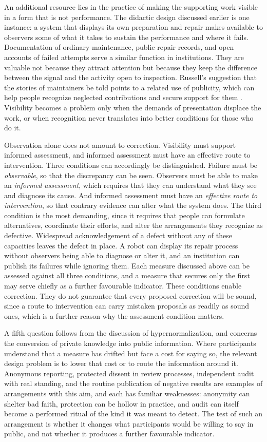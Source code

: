 \documentclass[11pt]{article}
\theoremstyle{definition}
\theoremstyle{remark}
\begin{document}
An additional resource lies in the practice of making the supporting work visible in a form that is not performance. The didactic design discussed earlier is one instance: a system that displays its own preparation and repair makes available to observers some of what it takes to sustain the performance and where it fails. Documentation of ordinary maintenance, public repair records, and open accounts of failed attempts serve a similar function in institutions. They are valuable not because they attract attention but because they keep the difference between the signal and the activity open to inspection. Russell's suggestion that the stories of maintainers be told points to a related use of publicity, which can help people recognize neglected contributions and secure support for them \cite{russell2017}. Visibility becomes a problem only when the demands of presentation displace the work, or when recognition never translates into better conditions for those who do it.

Observation alone does not amount to correction. Visibility must support informed assessment, and informed assessment must have an effective route to intervention. Three conditions can accordingly be distinguished. Failure must be \emph{observable}, so that the discrepancy can be seen. Observers must be able to make an \emph{informed assessment}, which requires that they can understand what they see and diagnose its cause. And informed assessment must have an \emph{effective route to intervention}, so that contrary evidence can alter what the system does. The third condition is the most demanding, since it requires that people can formulate alternatives, coordinate their efforts, and alter the arrangements they recognize as defective. Widespread acknowledgement of a defect without any of these capacities leaves the defect in place. A robot can display its repair process without observers being able to diagnose or alter it, and an institution can publish its failures while ignoring them. Each measure discussed above can be assessed against all three conditions, and a measure that secures only the first may serve chiefly as a further favourable indicator. These conditions enable correction. They do not guarantee that every proposed correction will be sound, since a route to intervention can carry mistaken proposals as readily as sound ones, which is a further reason why the assessment condition matters.

A fifth question follows from the discussion of hypernormalization, and concerns the conversion of private knowledge into public information. Where participants understand that a measure has drifted but face a cost for saying so, the relevant design problem is to lower that cost or to route the information around it. Anonymous reporting, protected dissent in review processes, independent audit with real standing, and the routine publication of negative results are examples of arrangements with this aim, and each has familiar weaknesses: anonymity can shelter bad faith, protection can be hollow in practice, and audit can itself become a performed ritual of the kind it was meant to detect. The test of such an arrangement is whether it changes what participants would be willing to say in public, and not whether it produces a further favourable indicator.
\end{document}
